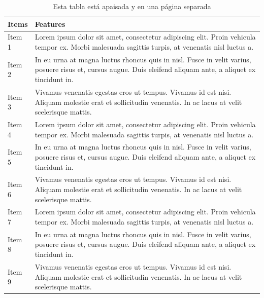 \documentclass[12pt,a4paper,oneside,]{article}
\numberwithin{dummy}{section}
\theoremstyle{ocrenumbox}
\theoremstyle{blacknumex}
\theoremstyle{blacknumbox}
\theoremstyle{ocrenum}
\theoremstyle{ocrenum}
\begin{document}
\begin{landscape}\begin{table}

\caption{\label{tab:unnamed-chunk-35}\label{tab:apaisada}Esta tabla 
          est\'a apaisada y en una p\'agina separada}
\centering
\begin{tabular}[t]{>{\raggedright\arraybackslash}p{2cm}>{\raggedright\arraybackslash}p{10cm}}
\toprule
Items & Features\\
\midrule
Item 1 & Lorem ipsum dolor sit amet, consectetur adipiscing elit.
    Proin vehicula tempor ex. Morbi malesuada sagittis turpis,
    at venenatis nisl luctus \vphantom{2} a.\\
Item 2 & In eu urna at magna luctus rhoncus quis in nisl. Fusce in velit
    varius, posuere risus et, cursus augue. Duis eleifend aliquam ante,
    a aliquet ex tincidunt \vphantom{2} in.\\
Item 3 & Vivamus venenatis egestas eros ut tempus. Vivamus id est nisi.
    Aliquam molestie erat et sollicitudin venenatis. In ac lacus at
    velit scelerisque \vphantom{2} mattis.\\
Item 4 & Lorem ipsum dolor sit amet, consectetur adipiscing elit.
    Proin vehicula tempor ex. Morbi malesuada sagittis turpis,
    at venenatis nisl luctus \vphantom{1} a.\\
Item 5 & In eu urna at magna luctus rhoncus quis in nisl. Fusce in velit
    varius, posuere risus et, cursus augue. Duis eleifend aliquam ante,
    a aliquet ex tincidunt \vphantom{1} in.\\
\addlinespace
Item 6 & Vivamus venenatis egestas eros ut tempus. Vivamus id est nisi.
    Aliquam molestie erat et sollicitudin venenatis. In ac lacus at
    velit scelerisque \vphantom{1} mattis.\\
Item 7 & Lorem ipsum dolor sit amet, consectetur adipiscing elit.
    Proin vehicula tempor ex. Morbi malesuada sagittis turpis,
    at venenatis nisl luctus a.\\
Item 8 & In eu urna at magna luctus rhoncus quis in nisl. Fusce in velit
    varius, posuere risus et, cursus augue. Duis eleifend aliquam ante,
    a aliquet ex tincidunt in.\\
Item 9 & Vivamus venenatis egestas eros ut tempus. Vivamus id est nisi.
    Aliquam molestie erat et sollicitudin venenatis. In ac lacus at
    velit scelerisque mattis.\\
\bottomrule
\end{tabular}
\end{table}
\end{landscape}
\end{document}
